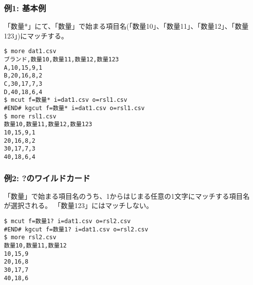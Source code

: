 \subsubsection*{例1: 基本例}

「数量*」にて、「数量」で始まる項目名(「数量10」、「数量11」、「数量12」、「数量123」)にマッチする。


\begin{Verbatim}[baselinestretch=0.7,frame=single]
$ more dat1.csv
ブランド,数量10,数量11,数量12,数量123
A,10,15,9,1
B,20,16,8,2
C,30,17,7,3
D,40,18,6,4
$ mcut f=数量* i=dat1.csv o=rsl1.csv
#END# kgcut f=数量* i=dat1.csv o=rsl1.csv
$ more rsl1.csv
数量10,数量11,数量12,数量123
10,15,9,1
20,16,8,2
30,17,7,3
40,18,6,4
\end{Verbatim}
\subsubsection*{例2: ?のワイルドカード}

「数量」で始まる項目名のうち、1からはじまる任意の1文字にマッチする項目名が選択される。
「数量123」にはマッチしない。


\begin{Verbatim}[baselinestretch=0.7,frame=single]
$ mcut f=数量1? i=dat1.csv o=rsl2.csv
#END# kgcut f=数量1? i=dat1.csv o=rsl2.csv
$ more rsl2.csv
数量10,数量11,数量12
10,15,9
20,16,8
30,17,7
40,18,6
\end{Verbatim}
